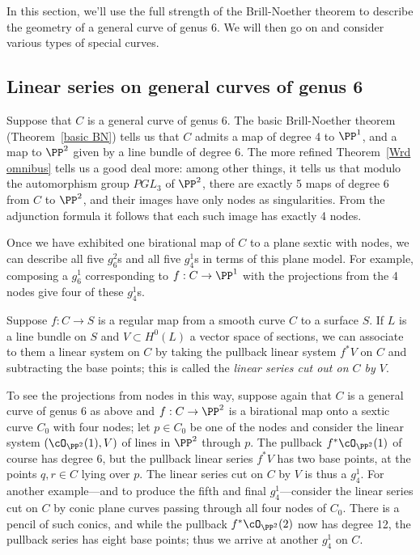 In this section, we'll use the full strength of the Brill-Noether theorem to describe the geometry of a general curve of genus 6. We will then go on and consider various types of special curves.

\subsection{Linear series on general curves of genus 6}

Suppose that $C$ is a general curve of genus 6. The basic Brill-Noether theorem (Theorem~\ref{basic BN}) tells us that $C$ admits a map of degree 4 to $\PP^1$, and a map to $\PP^2$ given by a line bundle of degree 6. The more refined Theorem~\ref{Wrd omnibus} tells us a good deal more: among other things, it tells us that modulo the automorphism group $PGL_3$ of $\PP^2$, there are exactly 5 maps of degree 6 from $C$ to $\PP^2$, and their images have only nodes
as singularities. From the adjunction formula it follows that each such image has exactly 4 nodes.
 
Once we have exhibited one birational map of $C$ to a plane sextic with nodes, we can describe all five $g^2_6$s and all five $g^1_4$s in terms of this plane model. For example, composing a $g^1_6$ corresponding to $f: C\to \PP^1$ with the projections from the 4 nodes give four of these $g^1_4$s. 


Suppose $f : C \to S$ is a regular map from a smooth curve $C$ to a surface $S$. If $L$ is a line bundle on $S$ and $V \subset H^0(L)$ a vector space of sections, we can associate to them a linear system on $C$ by taking the pullback linear system $f^*V$ on $C$ and subtracting the base points; this is called the \emph{linear series cut out on $C$ by $V$}. 

To see the projections from nodes in this way,  suppose again that $C$ is a general curve of genus 6 as above and $f : C \to \PP^2$ is a birational map onto a sextic curve $C_0$ with four nodes; let $p \in C_0$ be one of the nodes and consider the linear system $(\cO_{\PP^2}(1),V)$ of lines in $\PP^2$ through $p$. The pullback $f^*\cO_{\PP^2}(1)$ of course has degree 6, but the pullback linear series $f^*V$ has two base points, at the points $q, r \in C$ lying over $p$. The linear series cut on $C$ by $V$ is thus a $g^1_4$. For another example---and to produce the fifth and final $g^1_4$---consider the linear series cut on $C$ by conic plane curves passing through all four nodes of $C_0$. There is a pencil of such conics, and while the pullback $f^*\cO_{\PP^2}(2)$ now has degree 12, the pullback series has eight base points; thus we arrive at another $g^1_4$ on $C$.

